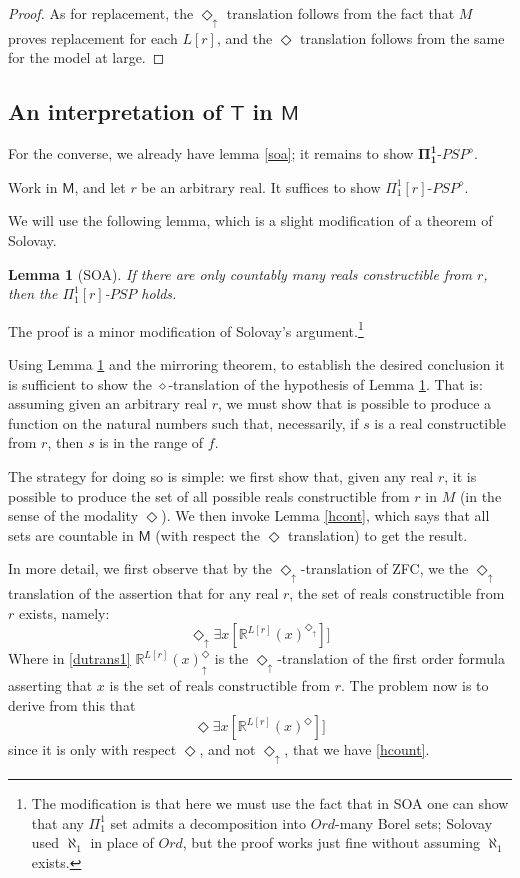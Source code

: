 \documentclass{article}
\newtheorem{Lemma}[Theorem]{Lemma}
\theoremstyle{definition}
\newcommand{\du}{\Diamond_\uparrow}
\begin{document}
\begin{proof}
    As for replacement, the $\du$ translation follows from the fact that $M$ proves replacement for 
    each $L[r]$, and the $\Diamond$ translation follows from the same for the model at large.
    

\end{proof}


\subsection{An interpretation of $\mathsf{T}$ in $\mathsf{M}$}
For the converse, we already have lemma \ref{soa}; 
it remains to show $\mathbf{\Pi^1_1}$-$PSP^\diamond$. 

Work in $\mathsf{M}$, and let $r$ be an arbitrary real. It suffices to show
$\Pi_1^1[r]$-$PSP^\diamond$. 

We will use the following lemma, which is a slight modification of a theorem of Solovay.
\begin{Lemma}[SOA]\label{sol}
    If there are only countably many reals constructible from $r$, then the $\Pi_1^1[r]$-$PSP$ holds.
\end{Lemma}
The proof is a minor modification of Solovay's argument.\footnote{The modification is that 
here we must use the fact that in SOA one can show 
that any $\Pi_1^1$ set admits a decomposition into $Ord$-many Borel sets; Solovay used $\aleph_1$ 
in place of $Ord$, but the proof works just fine without assuming $\aleph_1$ exists.} 

Using Lemma \ref{sol} and the mirroring theorem, to establish 
the desired conclusion it is sufficient to show the $\diamond$-translation 
of the hypothesis of Lemma \ref{sol}. That is: assuming given an arbitrary real $r$, 
we must show that is possible to produce a function on the natural numbers such that, 
necessarily, if $s$ is a real constructible from $r$, 
then $s$ is in the range of $f$.

The strategy for doing so is simple: we first show that, given any real $r$, 
it is possible to produce the set of all possible reals constructible from $r$ in 
$M$ (in the sense of the modality $\Diamond$). We then invoke Lemma \ref{hcont}, which 
says that all sets are countable in $\mathsf{M}$ (with respect the $\Diamond$ translation)
to get the result.

In more detail,
we first observe that by the $\du$-translation of ZFC, 
we the $\du$ translation of the assertion that for any real $r$, the 
set of reals constructible from $r$ exists, namely:
\begin{equation}\label{dutrans1}
    \du \exists x [\mathbb{R}^{L[r]}(x)^{\du}]]
\end{equation}
Where in \eqref{dutrans1} $\mathbb{R}^{L[r]}(x)^\du$ is the $\du$-translation of the first order 
formula asserting that $x$ 
is the set of reals constructible from $r$. The problem now is to derive from this 
that 
\begin{equation}\label{dtrans1}
    \Diamond \exists x [\mathbb{R}^{L[r]}(x)^{\Diamond}]]
\end{equation}
since it is only with respect $\Diamond$, and not $\du$, that we have \eqref{hcount}.
\end{document}

